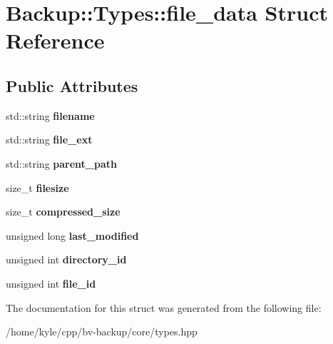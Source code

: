 \hypertarget{struct_backup_1_1_types_1_1file__data}{}\section{Backup\+:\+:Types\+:\+:file\+\_\+data Struct Reference}
\label{struct_backup_1_1_types_1_1file__data}
\subsection*{Public Attributes}
\begin{DoxyCompactItemize}
\item 
\mbox{\label{struct_backup_1_1_types_1_1file__data_a37ab1cd69f26c8a3dab7fa68361324f6}} 
std\+::string {\bfseries filename}
\item 
\mbox{\label{struct_backup_1_1_types_1_1file__data_a2046deee135dcceb809bb9d6c1fd067f}} 
std\+::string {\bfseries file\+\_\+ext}
\item 
\mbox{\label{struct_backup_1_1_types_1_1file__data_a824d438a6dbb979fd43d5a3ab5baabf6}} 
std\+::string {\bfseries parent\+\_\+path}
\item 
\mbox{\label{struct_backup_1_1_types_1_1file__data_afb20032f61bd9aae6a82956961d7c01e}} 
size\+\_\+t {\bfseries filesize}
\item 
\mbox{\label{struct_backup_1_1_types_1_1file__data_a966db7e9f839df95de076f0147afe6a7}} 
size\+\_\+t {\bfseries compressed\+\_\+size}
\item 
\mbox{\label{struct_backup_1_1_types_1_1file__data_a20455f1b6438496cfe080ae1292dba8d}} 
unsigned long {\bfseries last\+\_\+modified}
\item 
\mbox{\label{struct_backup_1_1_types_1_1file__data_a5309ae239f26a2e631a67b84a7f74f1b}} 
unsigned int {\bfseries directory\+\_\+id}
\item 
\mbox{\label{struct_backup_1_1_types_1_1file__data_a87b1dddbd6d13fd64db52e0b7e1f64b3}} 
unsigned int {\bfseries file\+\_\+id}
\end{DoxyCompactItemize}


The documentation for this struct was generated from the following file\+:\begin{DoxyCompactItemize}
\item 
/home/kyle/cpp/bv-\/backup/core/types.\+hpp\end{DoxyCompactItemize}
